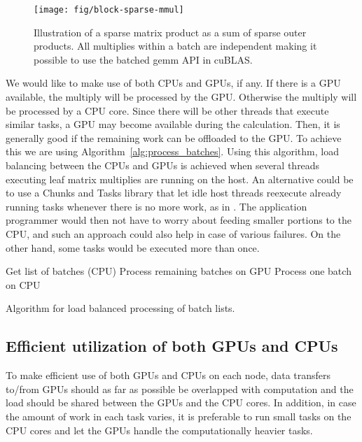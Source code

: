 \documentclass{elsarticle}
\begin{document}
\begin{figure}
  \begin{center}
    \texttt{[image: fig/block-sparse-mmul]}   
  \end{center}
  \caption{Illustration of a sparse matrix product as a sum of sparse
    outer products. All multiplies within a batch are independent
    making it possible to use the batched gemm API in
    cuBLAS. \label{fig:block-sparse-mmul}}
\end{figure}

We would like to make use of both CPUs and GPUs, if any. If there is a
GPU available, the multiply will be processed by the GPU. Otherwise the
multiply will be processed by a CPU core. Since there will be other
threads that execute similar tasks, a GPU may become available during
the calculation. Then, it is generally good if the remaining work can be
offloaded to the GPU. To achieve this we are using
Algorithm~\ref{alg:process_batches}.  Using this algorithm, load balancing
between the CPUs and GPUs is achieved when several threads executing
leaf matrix multiplies are running on the host.  An alternative could
be to use a Chunks and Tasks library that let idle host threads
reexecute already running tasks whenever there is no more work, as in
\cite{beri2014scheduling}. The application programmer would then not
have to worry about feeding smaller portions to the CPU, and such an
approach could also help in case of various failures.  On the other
hand, some tasks would be executed more than once.

\begin{algorithm}
\begin{algorithmic}[1]
  \State Get list of batches (CPU) 
  \State Process remaining batches on GPU \Else
  \State Process one batch on CPU \EndIf
  \EndWhile
\end{algorithmic}
\caption{Algorithm for load balanced processing of batch
  lists.  \label{alg:process_batches}}
\end{algorithm}

\subsection{Efficient utilization of both GPUs and CPUs}

To make efficient use of both GPUs and CPUs on each node, data
transfers to/from GPUs should as far as possible be overlapped with
computation and the load should be shared between the GPUs and the CPU
cores. In addition, in case the amount of work in each task varies, it
is preferable to run small tasks on the CPU cores and let the GPUs
handle the computationally heavier tasks.
\end{document}
